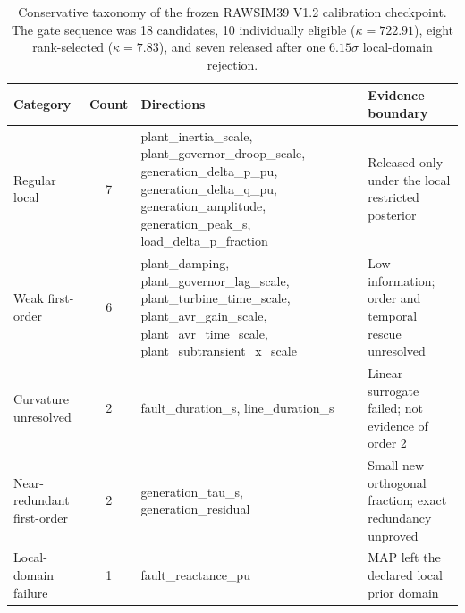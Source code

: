 \begin{table}[!t]
\caption{Conservative taxonomy of the frozen RAWSIM39 V1.2 calibration checkpoint. The gate sequence was 18 candidates, 10 individually eligible ($\kappa=722.91$), eight rank-selected ($\kappa=7.83$), and seven released after one $6.15\sigma$ local-domain rejection.}
\label{tab:supp-rawsim39-v12-taxonomy}
\centering
\scriptsize
\begin{tabularx}{\textwidth}{@{}l c X X@{}}
\toprule
Category & Count & Directions & Evidence boundary \\
\midrule
Regular local & 7 & plant\_inertia\_scale, plant\_governor\_droop\_scale, generation\_delta\_p\_pu, generation\_delta\_q\_pu, generation\_amplitude, generation\_peak\_s, load\_delta\_p\_fraction & Released only under the local restricted posterior \\
Weak first-order & 6 & plant\_damping, plant\_governor\_lag\_scale, plant\_turbine\_time\_scale, plant\_avr\_gain\_scale, plant\_avr\_time\_scale, plant\_subtransient\_x\_scale & Low information; order and temporal rescue unresolved \\
Curvature unresolved & 2 & fault\_duration\_s, line\_duration\_s & Linear surrogate failed; not evidence of order 2 \\
Near-redundant first-order & 2 & generation\_tau\_s, generation\_residual & Small new orthogonal fraction; exact redundancy unproved \\
Local-domain failure & 1 & fault\_reactance\_pu & MAP left the declared local prior domain \\
\bottomrule
\end{tabularx}
\end{table}
